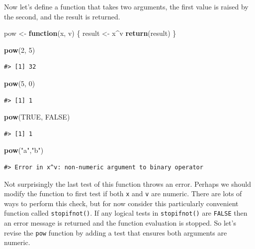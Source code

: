 \documentclass[
  11pt,
]{krantz}
\newenvironment{Shaded}{\begin{snugshade}}{\end{snugshade}}
\newcommand{\ControlFlowTok}[1]{\textcolor[rgb]{0.13,0.29,0.53}{\textbf{#1}}}
\newcommand{\DecValTok}[1]{\textcolor[rgb]{0.00,0.00,0.81}{#1}}
\newcommand{\KeywordTok}[1]{\textcolor[rgb]{0.13,0.29,0.53}{\textbf{#1}}}
\newcommand{\NormalTok}[1]{#1}
\newcommand{\OperatorTok}[1]{\textcolor[rgb]{0.81,0.36,0.00}{\textbf{#1}}}
\newcommand{\OtherTok}[1]{\textcolor[rgb]{0.56,0.35,0.01}{#1}}
\newcommand{\StringTok}[1]{\textcolor[rgb]{0.31,0.60,0.02}{#1}}
\theoremstyle{definition}
\theoremstyle{definition}
\theoremstyle{definition}
\theoremstyle{definition}
\theoremstyle{remark}
\begin{document}
Now let's define a function that takes two arguments, the first value is raised by the second, and the result is returned.

\begin{Shaded}
\begin{Highlighting}[]
\NormalTok{pow \textless{}{-}}\StringTok{ }\ControlFlowTok{function}\NormalTok{(x, v) \{}
\NormalTok{  result \textless{}{-}}\StringTok{ }\NormalTok{x}\OperatorTok{\^{}}\NormalTok{v}
  \KeywordTok{return}\NormalTok{(result)}
\NormalTok{\}}

\KeywordTok{pow}\NormalTok{(}\DecValTok{2}\NormalTok{, }\DecValTok{5}\NormalTok{)}
\end{Highlighting}
\end{Shaded}

\begin{verbatim}
#> [1] 32
\end{verbatim}

\begin{Shaded}
\begin{Highlighting}[]
\KeywordTok{pow}\NormalTok{(}\DecValTok{5}\NormalTok{, }\DecValTok{0}\NormalTok{)}
\end{Highlighting}
\end{Shaded}

\begin{verbatim}
#> [1] 1
\end{verbatim}

\begin{Shaded}
\begin{Highlighting}[]
\KeywordTok{pow}\NormalTok{(}\OtherTok{TRUE}\NormalTok{, }\OtherTok{FALSE}\NormalTok{)}
\end{Highlighting}
\end{Shaded}

\begin{verbatim}
#> [1] 1
\end{verbatim}

\begin{Shaded}
\begin{Highlighting}[]
\KeywordTok{pow}\NormalTok{(}\StringTok{"a"}\NormalTok{,}\StringTok{"b"}\NormalTok{)}
\end{Highlighting}
\end{Shaded}

\begin{verbatim}
#> Error in x^v: non-numeric argument to binary operator
\end{verbatim}

Not surprisingly the last test of this function throws an error. Perhaps we should modify the function to first test if both \texttt{x} and \texttt{v} are numeric. There are lots of ways to perform this check, but for now consider this particularly convenient function called \texttt{stopifnot()}. If any logical tests in \texttt{stopifnot()} are \texttt{FALSE} then an error message is returned and the function evaluation is stopped. So let's revise the \texttt{pow} function by adding a test that ensures both arguments are numeric.
\end{document}
